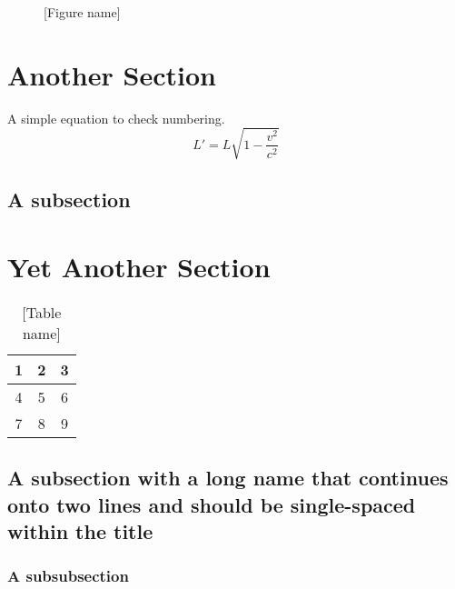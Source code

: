 \begin{figure}
\framebox[\textwidth]{\parbox{\textwidth}{\lipsum[1]}} %
\caption[{[Alternate short name]}]{[Figure name]}
\end{figure}

\section{Another Section}
A simple equation to check numbering.
\begin{equation}
L' = {L}{\sqrt{1-\frac{v^2}{c^2}}}
\end{equation}
\lipsum[2-3] %

\subsection{A subsection}
\lipsum[5-6] %

\section{Yet Another Section}
\lipsum[1] %
\begin{table}
\begin{center}
\begin{tabular}{ | c | c | c | }
\hline
  1 & 2 & 3 \\ \hline\hline
  4 & 5 & 6 \\
  7 & 8 & 9 \\
\hline
\end{tabular}\vspace{-1em}%
\end{center}
\caption{[Table name]}
\end{table}
\lipsum[2]

\subsection{A subsection with a long name that continues onto two lines and should be single-spaced within the title}\label{sec:another}
\lipsum[3]

\subsubsection{A subsubsection}\label{sec:minorstuff}
\lipsum[4]


